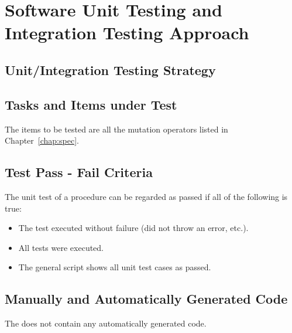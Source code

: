 
\chapter{Software Unit Testing and Integration Testing Approach}


\section{Unit/Integration Testing Strategy}


\section{Tasks and Items under Test}

The items to be tested are all the mutation operators listed in Chapter~\ref{chap:spec}.

\section{Test Pass - Fail Criteria}

The unit test of a procedure can be regarded as passed if all of the following is true:
\begin{itemize}
	\item The test executed without failure (did not throw an error, etc.).
	\item All tests were executed.
	\item The general script shows all unit test cases as passed.
\end{itemize}



\section{Manually and Automatically Generated Code}

The \FAQAS does not contain any automatically generated code.
